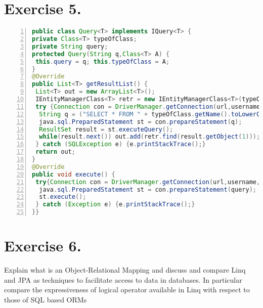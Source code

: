 \documentclass[10pt]{report}
\begin{document}
\section{Exercise 5.}
\label{QueryClass}
\begin{lstlisting}[numbers=left,language=Java,frame=single,breaklines=true,label=Code:ZeroIn, caption=Query Class.]
public class Query<T> implements IQuery<T> {
private Class<T> typeOfClass;
private String query;
protected Query(String q,Class<T> A) {
 this.query = q; this.typeOfClass = A;
}
@Override
public List<T> getResultList() {
 List<T> out = new ArrayList<T>();
 IEntityManagerClass<T> retr = new IEntityManagerClass<T>(typeOfClass);
 try {Connection con = DriverManager.getConnection(url,username,password);
  String q = ("SELECT * FROM " + typeOfClass.getName().toLowerCase() + ";");
  java.sql.PreparedStatement st = con.prepareStatement(q);
  ResultSet result = st.executeQuery();
  while(result.next()) out.add(retr.find(result.getObject(1)));
 } catch (SQLException e) {e.printStackTrace();}
 return out;
}
@Override
public void execute() {
 try{Connection con = DriverManager.getConnection(url,username,password);
  java.sql.PreparedStatement st = con.prepareStatement(query);
  st.execute();
 } catch (Exception e) {e.printStackTrace();}
}}
\end{lstlisting}
\section{Exercise 6.}
\label{Second}

Explain what is an Object-Relational Mapping and discuss and compare Linq and JPA as techniques to facilitate access  to  data  in  databases.
In  particular  compare  the  expressiveness  of  logical  operator  available  in  Linq  with respect to those of SQL based ORMs



\end{document}
